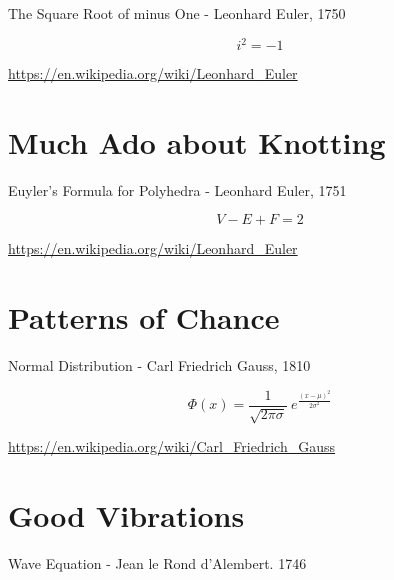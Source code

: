 \documentclass[12pt]{article}
\begin{document}
The Square Root of minus One - Leonhard Euler, 1750

\begin{equation*} i^2 = -1 \end{equation*}

\vspace{2em}

\url{https://en.wikipedia.org/wiki/Leonhard_Euler}

\newpage
	

\section{Much Ado about Knotting}
	
Euyler's Formula for Polyhedra - Leonhard Euler, 1751

\vspace{2em}

\begin{equation*} V -E + F = 2 \end{equation*}

\vspace{2em}

\url{https://en.wikipedia.org/wiki/Leonhard_Euler}

\newpage


\section{Patterns of Chance}
	
Normal Distribution - Carl Friedrich Gauss, 1810

\vspace{2em}

\begin{equation*}\Phi{(x)} = \frac{1}{\sqrt{2 \pi \sigma}} \ e^\frac{(x - \mu)^2}{2 \sigma^2}\end{equation*}

\vspace{2em}

\url{https://en.wikipedia.org/wiki/Carl_Friedrich_Gauss}

\newpage


\section{Good Vibrations}
	
Wave Equation - Jean le Rond d'Alembert. 1746

\vspace{2em}
\end{document}
